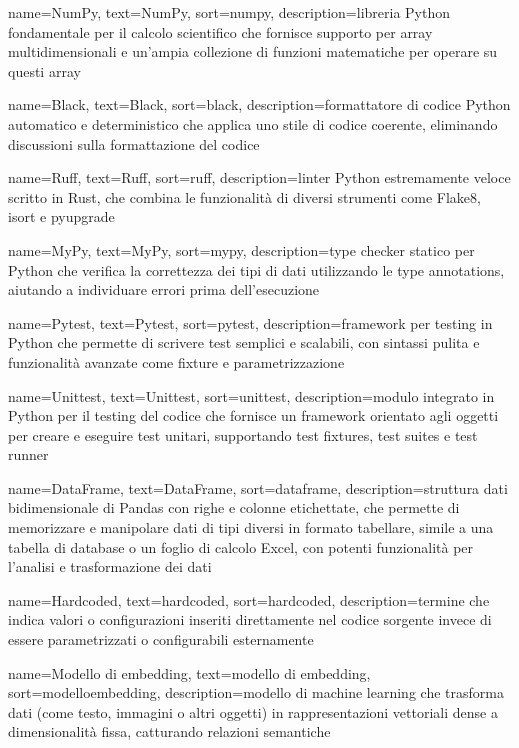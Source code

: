  {
    name=NumPy,
    text=NumPy,
    sort=numpy,
    description={libreria Python fondamentale per il calcolo scientifico che fornisce supporto per array multidimensionali e un'ampia collezione di funzioni matematiche per operare su questi array}
}

 {
    name=Black,
    text=Black,
    sort=black,
    description={formattatore di codice Python automatico e deterministico che applica uno stile di codice coerente, eliminando discussioni sulla formattazione del codice}
}

 {
    name=Ruff,
    text=Ruff,
    sort=ruff,
    description={linter Python estremamente veloce scritto in Rust, che combina le funzionalità di diversi strumenti come Flake8, isort e pyupgrade}
}

 {
    name=MyPy,
    text=MyPy,
    sort=mypy,
    description={type checker statico per Python che verifica la correttezza dei tipi di dati utilizzando le type annotations, aiutando a individuare errori prima dell'esecuzione}
}

 {
    name=Pytest,
    text=Pytest,
    sort=pytest,
    description={framework per testing in Python che permette di scrivere test semplici e scalabili, con sintassi pulita e funzionalità avanzate come fixture e parametrizzazione}
}

 {
    name=Unittest,
    text=Unittest,
    sort=unittest,
    description={modulo integrato in Python per il testing del codice che fornisce un framework orientato agli oggetti per creare e eseguire test unitari, supportando test fixtures, test suites e test runner}
}

 {
    name=DataFrame,
    text=DataFrame,
    sort=dataframe,
    description={struttura dati bidimensionale di Pandas con righe e colonne etichettate, che permette di memorizzare e manipolare dati di tipi diversi in formato tabellare, simile a una tabella di database o un foglio di calcolo Excel, con potenti funzionalità per l'analisi e trasformazione dei dati}
}

 {
    name=Hardcoded,
    text=hardcoded,
    sort=hardcoded,
    description={termine che indica valori o configurazioni inseriti direttamente nel codice sorgente invece di essere parametrizzati o configurabili esternamente}
}

 {
    name=Modello di embedding,
    text=modello di embedding,
    sort=modelloembedding,
    description={modello di machine learning che trasforma dati (come testo, immagini o altri oggetti) in rappresentazioni vettoriali dense a dimensionalità fissa, catturando relazioni semantiche}
}

